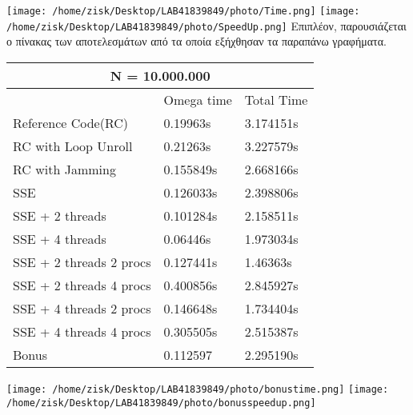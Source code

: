 \documentclass[11pt]{article}
\begin{document}
\texttt{[image: /home/zisk/Desktop/LAB41839849/photo/Time.png]}
\null \vfill
\texttt{[image: /home/zisk/Desktop/LAB41839849/photo/SpeedUp.png]}
\null \vfill
Επιπλέον, παρουσιάζεται ο πίνακας των αποτελεσμάτων από τα οποία εξήχθησαν τα παραπάνω γραφήματα.
\begin{table}[h]
\begin{tabular}{ |p{3.5cm}||p{2cm}|p{2cm}| }
 \hline
 \multicolumn{3}{|c|}{\textbf{N = 10.000.000}} \\
 \hline
                     & Omega time	  & Total Time\\
 \hline
 Reference Code(RC)	& 0.19963s	    & 3.174151s\\
 RC with Loop Unroll    & 0.21263s        & 3.227579s\\
 RC with Jamming	    & 0.155849s        & 2.668166s\\
 SSE					& 0.126033s 			& 2.398806s\\
 SSE + 2 threads		& 0.101284s			& 2.158511s\\
 SSE + 4 threads		& 0.06446s			& 1.973034s\\
 SSE + 2 threads 2 procs		& 0.127441s		& 1.46363s\\
 SSE + 2 threads 4 procs		& 0.400856s		& 2.845927s\\
 SSE + 4 threads 2 procs		& 0.146648s		& 1.734404s\\
 SSE + 4 threads 4 procs		& 0.305505s		& 2.515387s\\
 Bonus						& 0.112597		& 2.295190s\\
  \hline
\end{tabular}
\end{table}

\texttt{[image: /home/zisk/Desktop/LAB41839849/photo/bonustime.png]}
\null \vfill
\texttt{[image: /home/zisk/Desktop/LAB41839849/photo/bonusspeedup.png]}
\null \vfill
\end{document}
